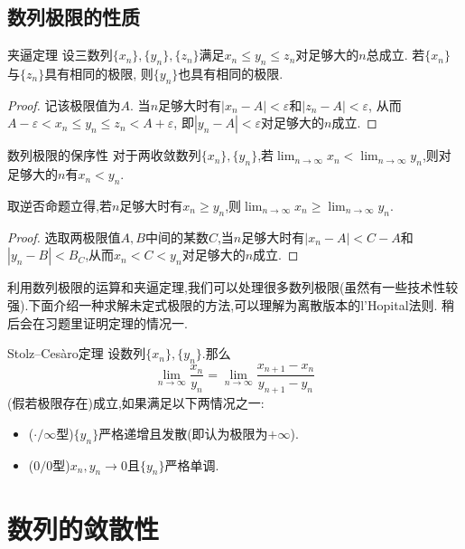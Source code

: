 \subsection{数列极限的性质}

\begin{theorem}{夹逼定理}
	设三数列$\{ x_n \},\{ y_n \},\{ z_n \}$满足$x_n \leq y_n \leq z_n$对足够大的$n$总成立. 若$\{ x_n \}$与$\{ z_n \}$具有相同的极限, 则$\{ y_n \}$也具有相同的极限.
\end{theorem}
\begin{proof}
	记该极限值为$A$. 当$n$足够大时有$|x_n-A|<\varepsilon$和$|z_n-A|<\varepsilon$, 从而$A-\varepsilon < x_n \leq y_n \leq z_n < A+\varepsilon$, 即$|y_n-A|<\varepsilon$对足够大的$n$成立.
\end{proof}

\begin{theorem}{数列极限的保序性}
	对于两收敛数列$\{ x_n \},\{ y_n \}$,若$\lim_{n \to \infty} x_n < \lim_{n \to \infty} y_n$,则对足够大的$n$有$x_n<y_n$.
\end{theorem}
\begin{remark}
	取逆否命题立得,若$n$足够大时有$x_n \geq y_n$,则$\lim_{n \to \infty} x_n \geq \lim_{n \to \infty} y_n$.
\end{remark}
\begin{proof}
	选取两极限值$A,B$中间的某数$C$,当$n$足够大时有$|x_n-A|<C-A$和$|y_n-B|<B_C$,从而$x_n<C<y_n$对足够大的$n$成立.
\end{proof}

利用数列极限的运算和夹逼定理,我们可以处理很多数列极限(虽然有一些技术性较强).下面介绍一种求解未定式极限的方法,可以理解为离散版本的l'Hopital法则. 稍后会在习题里证明定理的情况一. 

\begin{theorem}{Stolz–Cesàro定理}
	设数列$\{ x_n \},\{ y_n \}$.那么$$\lim_{n\to \infty} \frac{x_n}{y_n} = \lim_{n\to \infty} \frac{x_{n+1}-x_n}{y_{n+1}-y_n}$$(假若极限存在)成立,如果满足以下两情况之一:
	\begin{itemize}
		\item ($\cdot / \infty$型)$\{ y_n \}$严格递增且发散(即认为极限为$+\infty$).
		\item ($0/0$型)$x_n,y_n \to 0$且$\{ y_n \}$严格单调.
	\end{itemize}
\end{theorem}

\newpage
\section{数列的敛散性}

